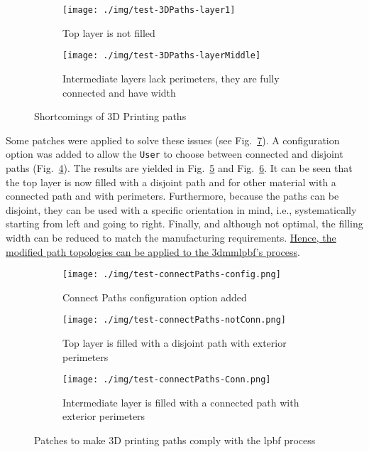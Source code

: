 \begin{figure}[htbp!]
  \centering
%
  \begin{subfigure}[t]{0.48\textwidth}
  \centering
  \texttt{[image: ./img/test-3DPaths-layer1]}
  \caption{Top layer is not filled}%
  \label{fig:test-3DPaths-layer1}
\end{subfigure}
%
  \begin{subfigure}[t]{0.48\textwidth}
  \centering
  \texttt{[image: ./img/test-3DPaths-layerMiddle]}
  \caption{Intermediate layers lack perimeters, they are fully connected and
    have width}%
  \label{fig:test-3DPaths-layerMiddle}
  \end{subfigure}
  \caption{Shortcomings of 3D Printing paths}%
  \label{fig:shortcomings-3DPrinting-paths}
\end{figure}

Some patches were applied to solve these issues (see Fig.~\ref{fig:patches-3D-lpbf}). A configuration option was added to allow the \texttt{User} to
choose between connected and disjoint paths
(Fig.~\ref{fig:test-connectPaths-config}). The results are yielded in
Fig.~\ref{fig:test-connectPaths-notConn} and
Fig.~\ref{fig:test-connectPaths-Conn}. It can be seen that the top layer is now
filled with a disjoint path and for other material with a connected path and
with perimeters. Furthermore, because the paths can be disjoint, they can be
used with a specific orientation in mind, i.e., systematically starting from
left and going to right. Finally, and although not optimal, the filling width can be reduced to match the
manufacturing requirements.
\underline{Hence, the modified path topologies can be applied to the \gls{3dmmlpbf}'s process}.

\begin{figure}[htbp!]
  \centering
  \begin{subfigure}[t]{1.0\textwidth}
  \centering
  \texttt{[image: ./img/test-connectPaths-config.png]}
  \caption{Connect Paths configuration option added}%
  \label{fig:test-connectPaths-config}
  \end{subfigure}
%
  \begin{subfigure}[t]{0.48\textwidth}
  \centering
  \texttt{[image: ./img/test-connectPaths-notConn.png]}
  \caption{Top layer is filled with a disjoint path with exterior perimeters}%
  \label{fig:test-connectPaths-notConn}
\end{subfigure}
%
  \begin{subfigure}[t]{0.48\textwidth}
  \centering
  \texttt{[image: ./img/test-connectPaths-Conn.png]}
  \caption{Intermediate layer is filled with a connected path with exterior perimeters}%
  \label{fig:test-connectPaths-Conn}
  \end{subfigure}
  \caption{Patches to make 3D printing paths comply with the \gls{lpbf} process}%
  \label{fig:patches-3D-lpbf}
\end{figure}

